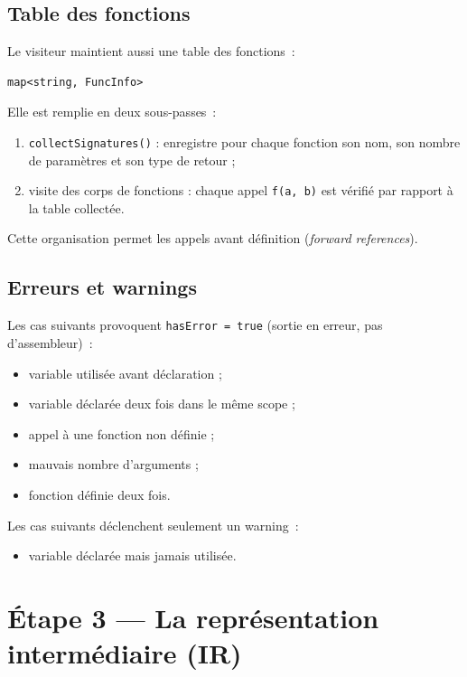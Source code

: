 \documentclass[11pt,a4paper]{article}
\begin{document}
\subsection{Table des fonctions}

Le visiteur maintient aussi une table des fonctions~:

\begin{lstlisting}
map<string, FuncInfo>
\end{lstlisting}

Elle est remplie en deux sous-passes~:

\begin{enumerate}
  \item \texttt{collectSignatures()} : enregistre pour chaque fonction son nom, son nombre de paramètres et son type de retour ;
  \item visite des corps de fonctions : chaque appel \texttt{f(a, b)} est vérifié par rapport à la table collectée.
\end{enumerate}

Cette organisation permet les appels avant définition (\emph{forward references}).

\subsection{Erreurs et warnings}

Les cas suivants provoquent \texttt{hasError = true} (sortie en erreur, pas d'assembleur)~:

\begin{itemize}
  \item variable utilisée avant déclaration ;
  \item variable déclarée deux fois dans le même scope ;
  \item appel à une fonction non définie ;
  \item mauvais nombre d'arguments ;
  \item fonction définie deux fois.
\end{itemize}

Les cas suivants déclenchent seulement un warning~:

\begin{itemize}
  \item variable déclarée mais jamais utilisée.
\end{itemize}

\section{Étape 3 --- La représentation intermédiaire (IR)}
\end{document}
